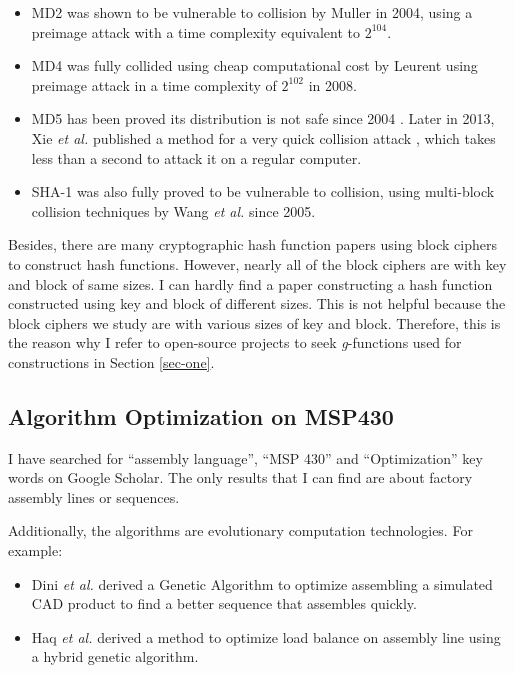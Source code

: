 \documentclass[sigconf, review=false]{acmart}
\let\OldTexttrademark\texttrademark
\renewcommand{\texttrademark}{\OldTexttrademark\xspace}%
\begin{document}
\begin{itemize}
    \item MD2 was shown to be vulnerable to collision by Muller in 2004,
          using a preimage attack with a time complexity equivalent to $2^{104}$. \cite{muller2004md2}
    \item MD4 was fully collided using cheap computational cost by Leurent
          using preimage attack in a time complexity of $2^{102}$ in 2008. \cite{leurent2008md4}
    \item MD5 has been proved its distribution is not safe since 2004 \cite{hawkes2004musings}.
          Later in 2013, Xie \textit{et al.} published a method for a very quick collision attack \cite{xie2013fast},
          which takes less than a second to attack it on a regular computer.
    \item SHA-1 was also fully proved to be vulnerable to collision, using multi-block collision techniques
          by Wang \textit{et al.} since 2005. \cite{wang2005finding}
\end{itemize}

Besides, there are many cryptographic hash function papers using block ciphers to construct hash functions.
However, nearly all of the block ciphers are with key and block of same sizes.
I can hardly find a paper constructing a hash function constructed using key and block of different sizes.
This is not helpful because the block ciphers we study are with various sizes of key and block.
Therefore, this is the reason why I refer to open-source projects to seek \textit{g}-functions used for constructions
in Section \ref{sec-one}.

\subsection{Algorithm Optimization on MSP430} \label{sec-alg-opt}
I have searched for ``assembly language'', ``MSP 430'' and ``Optimization'' key words on Google\texttrademark Scholar.
The only results that I can find are about factory assembly lines or sequences.

Additionally, the algorithms are evolutionary computation technologies. For example:

\begin{itemize}
    \item Dini \textit{et al.} derived a Genetic Algorithm to optimize assembling a simulated CAD product
          to find a better sequence that assembles quickly. \cite{dini1999generation}
    \item Haq \textit{et al.} derived a method to optimize load balance on assembly line
          using a hybrid genetic algorithm. \cite{haq2006hybrid}
\end{itemize}
\end{document}
